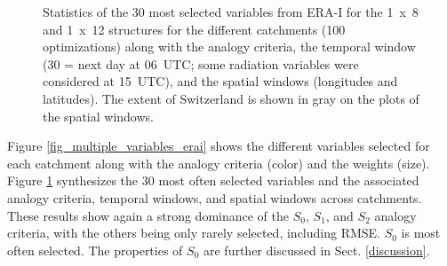 \documentclass[draft]{agujournal2019}
\begin{document}
\begin{figure}[H]
	\noindent{}
	\caption{Statistics of the 30 most selected variables from ERA-I for the 1~x~8 and 1~x~12 structures for the different catchments (100 optimizations) along with the analogy criteria, the temporal window (30 = next day at 06~UTC; some radiation variables were considered at 15~UTC), and the spatial windows (longitudes and latitudes). The extent of Switzerland is shown in gray on the plots of the spatial windows.}
	\label{fig_stats_params_erai}
\end{figure}


Figure \ref{fig_multiple_variables_erai} shows the different variables selected for each catchment along with the analogy criteria (color) and the weights (size). Figure \ref{fig_stats_params_erai} synthesizes the 30 most often selected variables and the associated analogy criteria, temporal windows, and spatial windows across catchments. These results show again a strong dominance of the $S_{0}$, $S_{1}$, and $S_{2}$ analogy criteria, with the others being only rarely selected, including RMSE. $S_{0}$ is most often selected. The properties of $S_{0}$ are further discussed in Sect. \ref{discussion}.  
\end{document}
